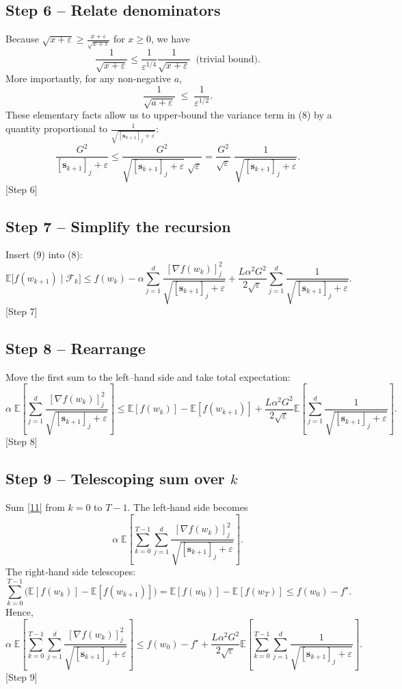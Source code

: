 \documentclass{article}
\begin{document}
\subsection*{Step 6 – Relate denominators}
Because $\sqrt{x+\varepsilon}\ge \frac{x+\varepsilon}{\sqrt{x+\varepsilon}}$ for $x\ge0$, we have
\[
\frac{1}{\sqrt{x+\varepsilon}}\le \frac{1}{\varepsilon^{1/4}}\frac{1}{\sqrt{x+\varepsilon}} 
\;\;\text{(trivial bound)}.
\]
More importantly, for any non‑negative $a$,
\[
\frac{1}{\sqrt{a+\varepsilon}} \;\le\; \frac{1}{\varepsilon^{1/2}} .
\]
These elementary facts allow us to upper‑bound the variance term in (8) by a quantity proportional to $\frac{1}{\sqrt{[\mathbf{s}_{k+1}]_j+\varepsilon}}$:
\[
\frac{G^{2}}{[\mathbf{s}_{k+1}]_j+\varepsilon}
   \le \frac{G^{2}}{\sqrt{[\mathbf{s}_{k+1}]_j+\varepsilon}\;\sqrt{\varepsilon}}
   = \frac{G^{2}}{\sqrt{\varepsilon}}\;\frac{1}{\sqrt{[\mathbf{s}_{k+1}]_j+\varepsilon}} .
\tag{9}
\]
[Step 6]

\subsection*{Step 7 – Simplify the recursion}
Insert (9) into (8):
\[
\mathbb{E}\!\bigl[f(w_{k+1})\mid\mathcal{F}_k\bigr]
\le f(w_k)
 -\alpha\!\sum_{j=1}^{d}\frac{[\nabla f(w_k)]_j^{2}}
                         {\sqrt{[\mathbf{s}_{k+1}]_j+\varepsilon}}
 +\frac{L\alpha^{2}G^{2}}{2\sqrt{\varepsilon}}
   \!\sum_{j=1}^{d}\frac{1}{\sqrt{[\mathbf{s}_{k+1}]_j+\varepsilon}} .
\tag{10}
\]
[Step 7]

\subsection*{Step 8 – Rearrange}
Move the first sum to the left–hand side and take total expectation:
\[
\alpha\;\mathbb{E}\!\left[\sum_{j=1}^{d}
        \frac{[\nabla f(w_k)]_j^{2}}{\sqrt{[\mathbf{s}_{k+1}]_j+\varepsilon}}\right]
\le \mathbb{E}[f(w_k)]-\mathbb{E}[f(w_{k+1})]
   +\frac{L\alpha^{2}G^{2}}{2\sqrt{\varepsilon}}
      \mathbb{E}\!\left[\sum_{j=1}^{d}
        \frac{1}{\sqrt{[\mathbf{s}_{k+1}]_j+\varepsilon}}\right].
\tag{11}
\]
[Step 8]

\subsection*{Step 9 – Telescoping sum over $k$}
Sum \eqref{11} from $k=0$ to $T-1$.
The left‑hand side becomes
\[
\alpha\;\mathbb{E}\!\left[\sum_{k=0}^{T-1}\sum_{j=1}^{d}
        \frac{[\nabla f(w_k)]_j^{2}}{\sqrt{[\mathbf{s}_{k+1}]_j+\varepsilon}}\right].
\]
The right‑hand side telescopes:
\[
\sum_{k=0}^{T-1}\bigl(\mathbb{E}[f(w_k)]-\mathbb{E}[f(w_{k+1})]\bigr)
   = \mathbb{E}[f(w_0)]-\mathbb{E}[f(w_T)]
   \le f(w_0)-f^{\star}.
\]
Hence,
\[
\alpha\;\mathbb{E}\!\left[\sum_{k=0}^{T-1}\sum_{j=1}^{d}
        \frac{[\nabla f(w_k)]_j^{2}}{\sqrt{[\mathbf{s}_{k+1}]_j+\varepsilon}}\right]
\le f(w_0)-f^{\star}
   +\frac{L\alpha^{2}G^{2}}{2\sqrt{\varepsilon}}
      \mathbb{E}\!\left[\sum_{k=0}^{T-1}\sum_{j=1}^{d}
        \frac{1}{\sqrt{[\mathbf{s}_{k+1}]_j+\varepsilon}}\right].
\tag{12}
\]
[Step 9]
\end{document}
